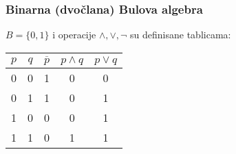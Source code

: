 \subsubsection{Binarna (dvočlana) Bulova algebra}
	$B = \{ 0, 1 \}$ i operacije $\land, \lor, \neg$ su definisane tablicama:
	\begin{table}[h!]
	\centering
	\begin{tabular}{|c|c|c|c|c|}
		\hline
		$p$ & $q$ & $\overline{p}$ & $p\land q$ & $p\lor q$ \\ \hline
		0 & 0 & 1 & 0        & 0       \\ \hline
		0 & 1 & 1 & 0        & 1       \\ \hline
		1 & 0 & 0 & 0        & 1       \\ \hline
		1 & 1 & 0 & 1        & 1       \\ \hline
	\end{tabular}
	\end{table}

